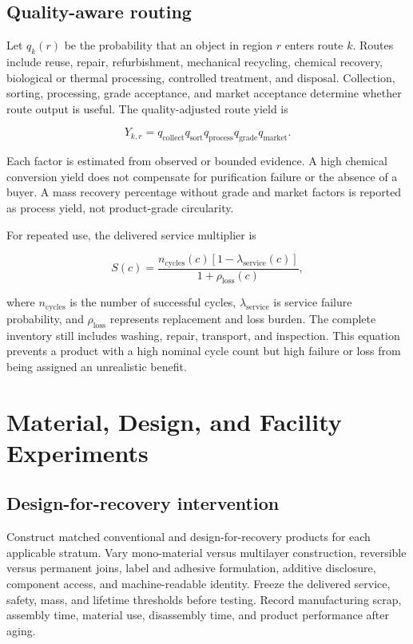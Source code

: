\documentclass[conference]{IEEEtran}
\begin{document}
\subsection{Quality-aware routing}

Let $q_k(r)$ be the probability that an object in region $r$ enters route $k$. Routes include reuse, repair, refurbishment, mechanical recycling, chemical recovery, biological or thermal processing, controlled treatment, and disposal. Collection, sorting, processing, grade acceptance, and market acceptance determine whether route output is useful. The quality-adjusted route yield is

\begin{equation}
Y_{k,r}=q_{\mathrm{collect}}q_{\mathrm{sort}}q_{\mathrm{process}}q_{\mathrm{grade}}q_{\mathrm{market}}.
\label{eq:yield}
\end{equation}

Each factor is estimated from observed or bounded evidence. A high chemical conversion yield does not compensate for purification failure or the absence of a buyer. A mass recovery percentage without grade and market factors is reported as process yield, not product-grade circularity.

For repeated use, the delivered service multiplier is

\begin{equation}
S(c)=\frac{n_{\mathrm{cycles}}(c)[1-\lambda_{\mathrm{service}}(c)]}{1+\rho_{\mathrm{loss}}(c)},
\label{eq:service}
\end{equation}

where $n_{\mathrm{cycles}}$ is the number of successful cycles, $\lambda_{\mathrm{service}}$ is service failure probability, and $\rho_{\mathrm{loss}}$ represents replacement and loss burden. The complete inventory still includes washing, repair, transport, and inspection. This equation prevents a product with a high nominal cycle count but high failure or loss from being assigned an unrealistic benefit.

\section{Material, Design, and Facility Experiments}

\subsection{Design-for-recovery intervention}

Construct matched conventional and design-for-recovery products for each applicable stratum. Vary mono-material versus multilayer construction, reversible versus permanent joins, label and adhesive formulation, additive disclosure, component access, and machine-readable identity. Freeze the delivered service, safety, mass, and lifetime thresholds before testing. Record manufacturing scrap, assembly time, material use, disassembly time, and product performance after aging.
\end{document}
